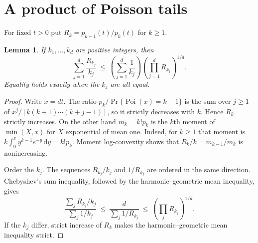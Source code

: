 \documentclass[11pt,a4paper]{article}
\newtheorem{lemma}[theorem]{Lemma}
\theoremstyle{remark}
\newcommand{\dd}{\,\mathrm d}
\DeclareMathOperator{\Poi}{Poi}
\begin{document}
\section{A product of Poisson tails}

For fixed \(t>0\) put \(R_k=p_{k-1}(t)/p_k(t)\) for \(k\ge1\).

\begin{lemma}\label{mean}
If \(k_1,\ldots,k_d\) are positive integers, then
\[
 \sum_{j=1}^d \frac{R_{k_j}}{k_j}
 \ \le\ \left(\sum_{j=1}^d\frac1{k_j}\right)
        \left(\prod_{j=1}^d R_{k_j}\right)^{1/d}.
\]
Equality holds exactly when the \(k_j\) are all equal.
\end{lemma}
\begin{proof}
Write \(x=dt\). The ratio \(p_k/\Pr\{\Poi(x)=k-1\}\) is the sum over \(j\ge1\) of \(x^j/[k(k+1)\cdots(k+j-1)]\), so it strictly decreases with \(k\). Hence \(R_k\) strictly increases. On the other hand \(m_k=k!p_k\) is the \(k\)th moment of \(\min(X,x)\) for \(X\) exponential of mean one. Indeed, for \(k\ge1\) that moment is \(k\int_0^x y^{k-1}e^{-y}\dd y=k!p_k\). Moment log-convexity shows that \(R_k/k=m_{k-1}/m_k\) is nonincreasing.

Order the \(k_j\). The sequences \(R_{k_j}/k_j\) and \(1/R_{k_j}\) are ordered in the same direction. Chebyshev's sum inequality, followed by the harmonic--geometric mean inequality, gives
\[
 \frac{\sum_j R_{k_j}/k_j}{\sum_j 1/k_j}
 \ \le\ \frac{d}{\sum_j 1/R_{k_j}}
 \ \le\ \left(\prod_jR_{k_j}\right)^{1/d}.
\]
If the \(k_j\) differ, strict increase of \(R_k\) makes the harmonic--geometric mean inequality strict.
\end{proof}
\end{document}
